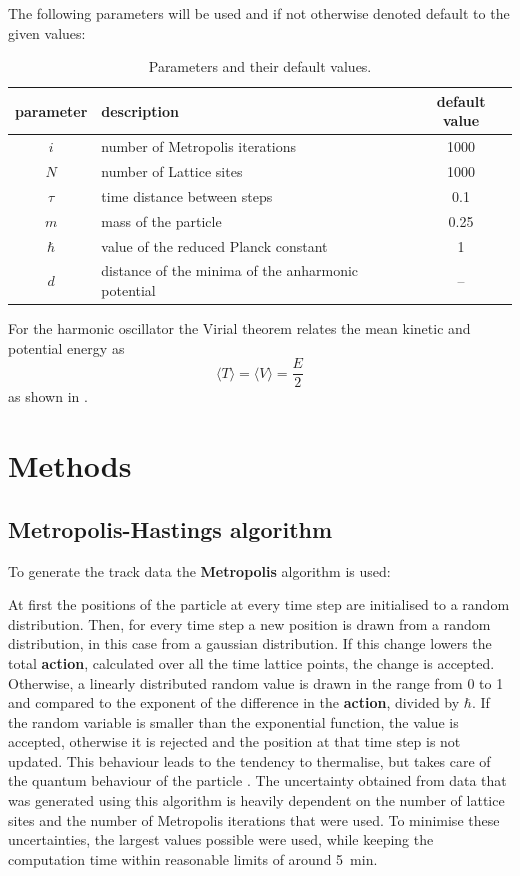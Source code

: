 \documentclass{scrartcl}
\begin{document}
		The following parameters will be used and if not otherwise denoted default to the given values:
		\begin{table}[H]
			\centering
			\begin{tabular}{c|l|c}
				parameter & description & default value\\
				\hline
				$i$ & number of Metropolis iterations & 1000\\
				$N$ & number of Lattice sites & 1000\\
				$\tau$ & time distance between steps & 0.1\\
				$m$ & mass of the particle & 0.25\\
				$\hbar$ & value of the reduced Planck constant & 1\\
				$d$ & distance of the minima of the anharmonic potential & --\\
			\end{tabular}
			\caption{Parameters and their default values.}
			\label{eq:parameters}
		\end{table}
		For the harmonic oscillator the Virial theorem relates the mean kinetic and potential energy as
		\begin{equation}
			\langle T \rangle = \langle V \rangle = \frac E2
			\label{eq:virial}
		\end{equation}
		as shown in \cite{carinena_falceto_ranada}.

	\section{Methods}
	\subsection{Metropolis-Hastings algorithm}
		To generate the track data the \textbf{Metropolis} algorithm is used:

		At first the positions of the particle at every time step are initialised to a random distribution.
		Then, for every time step a new position is drawn from a random distribution, in this case from a gaussian distribution.
		If this change lowers the total \textbf{action}, calculated over all the time lattice points, the change is accepted.
		Otherwise, a linearly distributed random value is drawn in the range from 0 to 1 and compared to the exponent of the difference in the \textbf{action}, divided by $\hbar$.
		If the random variable is smaller than the exponential function, the value is accepted, otherwise it is rejected and the position at that time step is not updated.
		This behaviour leads to the tendency to thermalise, but takes care of the quantum behaviour of the particle \cite{creutz_freedman, rodgers_raes}.
		The uncertainty obtained from data that was generated using this algorithm is heavily dependent on the number of lattice sites and the number of Metropolis iterations that were used.
		To minimise these uncertainties, the largest values possible were used, while keeping the computation time within reasonable limits of around \SI{5}{\minute}.
\end{document}
